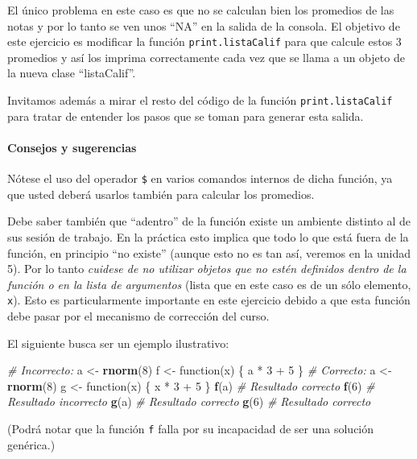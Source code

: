 \documentclass[]{article}
\newenvironment{Shaded}{}{}
\newcommand{\KeywordTok}[1]{\textcolor[rgb]{0.00,0.44,0.13}{\textbf{{#1}}}}
\newcommand{\DecValTok}[1]{\textcolor[rgb]{0.25,0.63,0.44}{{#1}}}
\newcommand{\CommentTok}[1]{\textcolor[rgb]{0.38,0.63,0.69}{\textit{{#1}}}}
\newcommand{\NormalTok}[1]{{#1}}
\begin{document}
El único problema en este caso es que no se calculan bien los promedios
de las notas y por lo tanto se ven unos ``NA'' en la salida de la
consola. El objetivo de este ejercicio es modificar la función
\texttt{print.listaCalif} para que calcule estos 3 promedios y así los
imprima correctamente cada vez que se llama a un objeto de la nueva
clase ``listaCalif''.

Invitamos además a mirar el resto del código de la función
\texttt{print.listaCalif} para tratar de entender los pasos que se toman
para generar esta salida.

\paragraph{Consejos y sugerencias}

Nótese el uso del operador \texttt{\$} en varios comandos internos de
dicha función, ya que usted deberá usarlos también para calcular los
promedios.

Debe saber también que ``adentro'' de la función existe un ambiente
distinto al de sus sesión de trabajo. En la práctica esto implica que
todo lo que está fuera de la función, en principio ``no existe'' (aunque
esto no es tan así, veremos en la unidad 5). Por lo tanto \emph{cuidese
de no utilizar objetos que no estén definidos dentro de la función o en
la lista de argumentos} (lista que en este caso es de un sólo elemento,
\texttt{x}). Esto es particularmente importante en este ejercicio debido
a que esta función debe pasar por el mecanismo de corrección del curso.

El siguiente busca ser un ejemplo ilustrativo:

\begin{Shaded}
\begin{Highlighting}[]
\CommentTok{# Incorrecto:}
\NormalTok{a <- }\KeywordTok{rnorm}\NormalTok{(}\DecValTok{8}\NormalTok{)}
\NormalTok{f <- function(x) \{}
    \NormalTok{a * }\DecValTok{3} \NormalTok{+ }\DecValTok{5}
\NormalTok{\}}
\CommentTok{# Correcto:}
\NormalTok{a <- }\KeywordTok{rnorm}\NormalTok{(}\DecValTok{8}\NormalTok{)}
\NormalTok{g <- function(x) \{}
    \NormalTok{x * }\DecValTok{3} \NormalTok{+ }\DecValTok{5}
\NormalTok{\}}
\KeywordTok{f}\NormalTok{(a)  }\CommentTok{# Resultado correcto}
\KeywordTok{f}\NormalTok{(}\DecValTok{6}\NormalTok{)  }\CommentTok{# Resultado incorrecto}
\KeywordTok{g}\NormalTok{(a)  }\CommentTok{# Resultado correcto}
\KeywordTok{g}\NormalTok{(}\DecValTok{6}\NormalTok{)  }\CommentTok{# Resultado correcto}
\end{Highlighting}
\end{Shaded}
(Podrá notar que la función \texttt{f} falla por su incapacidad de ser
una solución genérica.)
\end{document}
